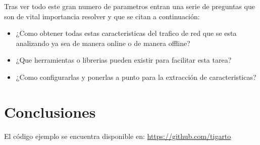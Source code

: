 \documentclass[12pt]{article}
\begin{document}
Tras ver todo este gran numero de parametros entran una serie de preguntas que son de vital importancia resolver y que se citan a continuación: 
\begin{itemize}
\item ¿Como obtener todas estas caracteristicas del trafico de red que se esta analizando ya sea de manera online o de manera offline?
\item ¿Que herramientas o librerias pueden existir para facilitar esta tarea?
\item ¿Como configurarlas y ponerlas a punto para la extracción de caracteristicas?
\end{itemize}




\section{Conclusiones}




El código ejemplo se encuentra disponible en: \url{https://github.com/tigarto}



\end{document}
